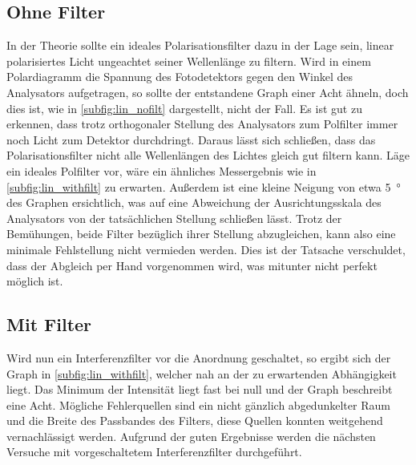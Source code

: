 \subsection{Ohne Filter}
In der Theorie sollte ein ideales Polarisationsfilter dazu in der Lage sein, linear polarisiertes Licht ungeachtet seiner Wellenlänge zu filtern.
Wird in einem Polardiagramm die Spannung des Fotodetektors gegen den Winkel des Analysators aufgetragen, so sollte der entstandene Graph einer Acht ähneln, doch dies ist, wie in \autoref{subfig:lin_nofilt} dargestellt, nicht der Fall.
Es ist gut zu erkennen, dass trotz orthogonaler Stellung des Analysators zum Polfilter immer noch Licht zum Detektor durchdringt.
Daraus lässt sich schließen, dass das Polarisationsfilter nicht alle Wellenlängen des Lichtes gleich gut filtern kann.
Läge ein ideales Polfilter vor, wäre ein ähnliches Messergebnis wie in \autoref{subfig:lin_withfilt} zu erwarten.
Außerdem ist eine kleine Neigung von etwa \SI{5}{\degree} des Graphen ersichtlich, was auf eine Abweichung der Ausrichtungsskala des Analysators von der tatsächlichen Stellung schließen lässt.
Trotz der Bemühungen, beide Filter bezüglich ihrer Stellung abzugleichen, kann also eine minimale Fehlstellung nicht vermieden werden.
Dies ist der Tatsache verschuldet, dass der Abgleich per Hand vorgenommen wird, was mitunter nicht perfekt möglich ist.

\subsection{Mit Filter}
Wird nun ein Interferenzfilter vor die Anordnung geschaltet, so ergibt sich der Graph in \autoref{subfig:lin_withfilt}, welcher nah an der zu erwartenden Abhängigkeit liegt.
Das Minimum der Intensität liegt fast bei null und der Graph beschreibt eine Acht.
Mögliche Fehlerquellen sind ein nicht gänzlich abgedunkelter Raum und die Breite des Passbandes des Filters, diese Quellen konnten weitgehend vernachlässigt werden.
Aufgrund der guten Ergebnisse werden die nächsten Versuche mit vorgeschaltetem Interferenzfilter durchgeführt.

